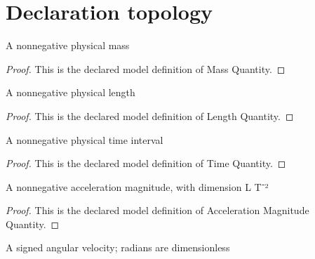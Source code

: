\section{Declaration topology}
\begin{definition}
  \label{def:physics:phyx-mini-0264:phyxminiproblems-problemphyxmini0264-massquantity}
  A nonnegative physical mass
\end{definition}
\begin{proof}
  This is the declared model definition of Mass Quantity.
\end{proof}
\begin{definition}
  \label{def:physics:phyx-mini-0264:phyxminiproblems-problemphyxmini0264-lengthquantity}
  A nonnegative physical length
\end{definition}
\begin{proof}
  This is the declared model definition of Length Quantity.
\end{proof}
\begin{definition}
  \label{def:physics:phyx-mini-0264:phyxminiproblems-problemphyxmini0264-timequantity}
  A nonnegative physical time interval
\end{definition}
\begin{proof}
  This is the declared model definition of Time Quantity.
\end{proof}
\begin{definition}
  \label{def:physics:phyx-mini-0264:phyxminiproblems-problemphyxmini0264-accelerationmagnitudequantity}
  A nonnegative acceleration magnitude, with dimension L T⁻²
\end{definition}
\begin{proof}
  This is the declared model definition of Acceleration Magnitude Quantity.
\end{proof}
\begin{definition}
  \label{def:physics:phyx-mini-0264:phyxminiproblems-problemphyxmini0264-angularvelocityquantity}
  A signed angular velocity; radians are dimensionless
\end{definition}

